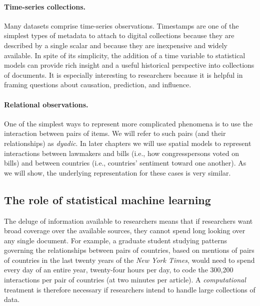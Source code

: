 \paragraph{Time-series collections.}  Many datasets comprise
time-series observations.  Timestamps are one of the simplest types of
metadata to attach to digital collections because they are described
by a single scalar and because they are inexpensive and widely
available.  In spite of its simplicity, the addition of a time
variable to statistical models can provide rich insight and a useful
historical perspective into collections of documents.  It is
especially interesting to researchers because it is helpful in framing
questions about causation, prediction, and influence.

\paragraph{Relational observations.}
One of the simplest ways to represent more complicated phenomena is to
use the interaction between pairs of items.  We will refer to such
pairs (and their relationships) as \emph{dyadic}. In later chapters we
will use spatial models to represent interactions between lawmakers
and bills (i.e., how congresspersons voted on bills) and between
countries (i.e., countries' sentiment toward one another).  As we will
show, the underlying representation for these cases is very similar.

\subsection*{The role of statistical machine learning}

The deluge of information available to researchers means that if
researchers want broad coverage over the available sources, they
cannot spend long looking over any single document.  For example, a
graduate student studying patterns governing the relationships between
pairs of countries, based on mentions of pairs of countries in the
last twenty years of the \emph{New York Times}, would need to spend
every day of an entire year, twenty-four hours per day, to code the
300,200 interactions per pair of countries (at two minutes per
article).  A \emph{computational} treatment is therefore necessary if
researchers intend to handle large collections of data.


